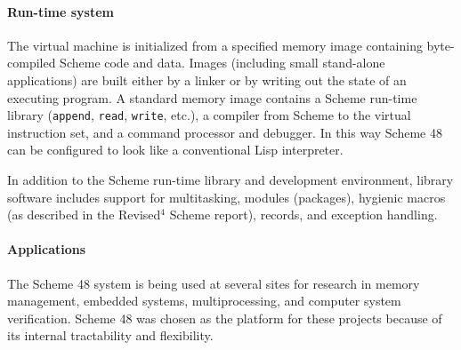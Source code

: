 \paragraph{Run-time system}

The virtual machine is initialized from a specified memory image
containing byte-compiled Scheme code and data.  Images (including
small stand-alone applications) are built either by a linker or by
writing out the state of an executing program.  A standard memory
image contains a Scheme run-time library ({\tt append}, {\tt read},
{\tt write}, etc.), a compiler from Scheme to the virtual instruction
set, and a command processor and debugger.  In this way Scheme 48 can
be configured to look like a conventional Lisp interpreter.

In addition to the Scheme run-time library and development
environment, library software includes support for multitasking,
modules (packages), hygienic macros (as described in the Revised$^4$
Scheme report), records, and exception handling.

\paragraph{Applications}

The Scheme 48 system is being used at several sites for research in
memory management, embedded systems, multiprocessing, and computer
system verification.  Scheme 48 was chosen as the platform for these
projects because of its internal tractability and flexibility.



